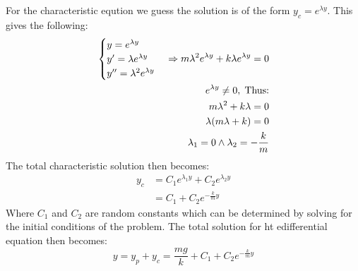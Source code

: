 \documentclass[11pt, a4paper]{article}
\begin{document}
For the characteristic eqution we guess the solution is of the form $y_c = e^{\lambda y}$. This gives the following:
\begin{align}
  \begin{cases}
    y = e^{\lambda y}\\
    y' = \lambda e^{\lambda y}\\
    y'' = \lambda^2 e^{\lambda y} 
  \end{cases}
  \Rightarrow
  m\lambda^2 e^{\lambda y} + k\lambda e^{\lambda y} = 0\\
  e^{\lambda y} \neq 0,\; \text{Thus:} \notag\\ 
  m\lambda^2 + k\lambda = 0 \notag\\
  \lambda(m\lambda + k) = 0 \notag\\
  \lambda_1 = 0 \wedge \lambda_2 = -\frac{k}{m}\\
\end{align}
The total characteristic solution then becomes:
\begin{align}
  y_c &= C_1e^{\lambda_1 y} + C_2e^{\lambda_2 y}\\
      &= C_1 + C_2e^{-\frac{k}{m}y}
\end{align}
Where $C_1$ and $C_2$ are random constants which can be determined by solving for the initial conditions of the problem. The total solution for ht edifferential equation then becomes:
\begin{equation}
  y = y_p + y_c = \frac{mg}{k} + C_1 + C_2e^{-\frac{k}{m}y}
\end{equation}
\end{document}
